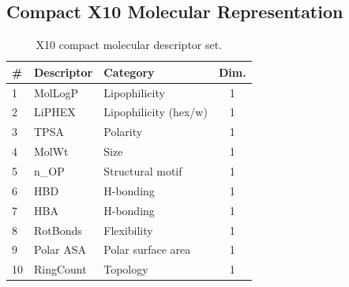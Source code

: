 \documentclass[conference]{IEEEtran}
\newif\ifdraftmode
\newcommand{\draftnote}[1]{%
  \ifdraftmode
    \par\noindent
    \colorbox{yellow!30}{\parbox{\dimexpr\columnwidth-2\fboxsep}{%
      \small\sffamily\textcolor{black!70}{#1}}}%
    \par\smallskip
  \fi
}
\newcommand{\dnote}[1]{%
  \ifdraftmode{\sffamily\small\textcolor{red!70!black}{[#1]}}\fi}
\begin{document}
\subsection{Compact X10 Molecular Representation}
\label{sec:x10}

\draftnote{%
\textbf{Include:} chemical motivation for each descriptor; interpretability;
low dimensionality; compatibility with 10-qubit experiments; avoidance of
outcome-driven feature selection; correlation and redundancy checks.\\
\textbf{Clarifications:}\\
\textbullet\ \texttt{n\_OP}: structural-motif count — do \emph{not} interpret
   causally.\\
\textbullet\ LiPHEX: predicts hexadecane/water partition — it is \emph{not} a
   bee-toxicity model.\\
\textbullet\ MolLogP and LiPHEX measure related but non-identical partition
   behavior.\\
\textbf{Placeholders needed:} exact frozen SMARTS definitions; descriptor
provenance and version.}

\begin{table}[htbp]
\caption{X10 compact molecular descriptor set.
\dnote{Confirm all descriptor names, symbols, and categories before submission.}}
\label{tab:x10}
\centering
\begin{tabular}{@{}lllc@{}}
\toprule
\textbf{\#} & \textbf{Descriptor} & \textbf{Category} & \textbf{Dim.} \\
\midrule
1  & MolLogP         & Lipophilicity          & 1 \\
2  & LiPHEX          & Lipophilicity (hex/w)  & 1 \\
3  & TPSA            & Polarity               & 1 \\
4  & MolWt           & Size                   & 1 \\
5  & n\_OP           & Structural motif       & 1 \\
6  & HBD             & H-bonding              & 1 \\
7  & HBA             & H-bonding              & 1 \\
8  & RotBonds        & Flexibility            & 1 \\
9  & Polar ASA       & Polar surface area     & 1 \\
10 & RingCount       & Topology               & 1 \\
\bottomrule
\end{tabular}
\end{table}
\end{document}
